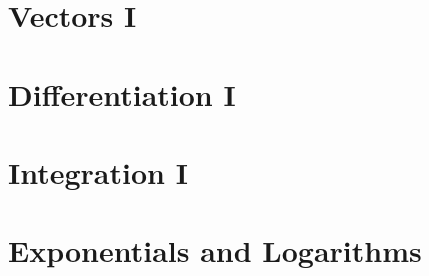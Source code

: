     \newpage

\section{Vectors I} \label{vectors_i}
    \newpage

\section{Differentiation I} \label{differentiation_i}
    \newpage

\section{Integration I} \label{integration_i}
    \newpage

\section{Exponentials and Logarithms} \label{exponentials_and_logarithms}
    \newpage